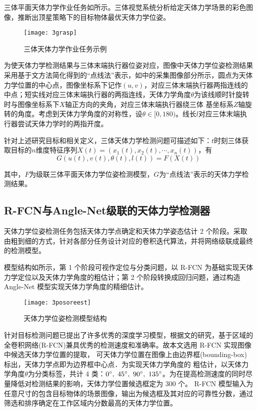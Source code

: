 \documentclass{dmuthesis}
\begin{document}
三体平面天体力学作业任务如所示。三体视觉系统分析给定天体力学场景的彩色图像，推断出顶星策略下的目标物体最优天体力学位姿。

\begin{figure}[!htbp]
	\centering
	\texttt{[image: 3grasp]}
	\caption{三体天体力学作业任务示例}
     \label{figgrasp}
\end{figure}

为使天体力学检测结果与三体末端执行器位姿对应，图像中天体力学位姿检测结果采用基于文\cite{bibb4}方法简化得到的“点线法”表示，如中的采集图像部分所示，圆点为天体力学位置的中心点，图像坐标系下记作$(u, v)$，对应三体末端执行器两指连线的中点；短实线对应三体末端执行器的两指连线，天体力学角度$\theta$为该线顺时针旋转时与图像坐标系下$X$轴正方向的夹角，对应三体末端执行器绕三体 基坐标系$Z$轴旋转的角度。考虑到天体力学角度的对称性，设$\theta\in [0, 180)$。线长$l$对应三体末端执行器尝试天体力学时的两指开度。

针对上述研究目标和相关定义，三体天体力学检测问题可描述如下：$t$时刻三体获取目标的$n$维度特征序列$X (t) = (x_1(t), x_2(t),\cdots, x_n(t))$，有
\begin{equation}
G(u(t), v(t), \theta(t), l(t)) = F(X (t))
\end{equation}

其中，$F$为级联三体平面天体力学位姿检测模型，$G$为“点线法”表示的天体力学检测结果。

\subsection{R-FCN与Angle-Net级联的天体力学检测器}

天体力学位姿检测任务包括天体力学点确定和天体力学姿态估计 2 个阶段。采取由粗到细的方式，针对各部分任务设计对应的卷积迭代算法，并将网络级联成最终的检测模型。

模型结构如所示，第 1 个阶段可视作定位与分类问题，以 R-FCN 为基础实现天体力学定位以及天体力学角度的粗估计；第 2 个阶段转换成回归问题，通过构造 Angle-Net 模型实现天体力学角度的精细估计。

\begin{figure}[!htbp]
	\centering
	\texttt{[image: 3posoreest]}
	\caption{天体力学位姿检测模型结构}
     \label{figpoe}
\end{figure}

针对目标检测问题已提出了许多优秀的深度学习模型，根据文的研究，基于区域的全卷积网络(R-FCN)兼具优秀的检测速度和准确率。故本文选用 R-FCN 实现图像中候选天体力学位置的提取， 可天体力学位置在图像上由边界框(bounding-box)标出，天体力学点即为边界框中心点．为实现天体力学角度的 粗估计，以天体力学角度$\theta$为分类标签，共计 4 类：$0\degree,\ 45\degree,\ 90\degree,\ 135\degree$。为在提高检测速度的同时尽量降低对检测结果的影响，天体力学位置候选框定为 300 个。 R-FCN 模型输入为任意尺寸的包含目标物体的场景图像，输出为候选框及其对应的可靠性分数，通过筛选和排序确定在工作区域内分数最高的天体力学位置。
\end{document}
